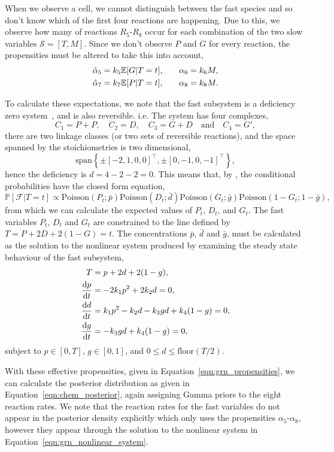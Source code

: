 \documentclass[final]{siamltex}
\begin{document}
When we observe a cell, we cannot distinguish between the fast species and so don't know which of the first four reactions are happening. Due to this, we observe how many of reactions $R_5$-$R_8$ occur for each combination of the two slow variables $\mathcal{S} = [T, M]$. Since we don't observe $P$ and $G$ for every reaction, the propensities must be altered to take this into account,
\begin{align}
	\hat{\alpha}_5 = k_5\mathbb{E}[G|T=t],\quad&\quad \alpha_6 = k_6M, \notag\\
	\hat{\alpha}_7 = k_7\mathbb{E}[P|T=t], \quad&\quad \alpha_8 = k_8M.\label{eqn:grn_propensities}
\end{align}

To calculate these expectations, we note that the fast subsystem is a deficiency zero system~\cite{anderson2010product}, and is also reversible. i.e. The system has four complexes, 
\[
	C_1 = P+P, \quad C_2 = D, \quad C_3 = G+D \quad \text{and} \quad  C_4 = G',
\]
there are two linkage classes (or two sets of reversible reactions), and the space spanned by the stoichiometries is two dimensional,
\[
	\text{span}\left\{\pm[-2, 1, 0, 0]^\top, \pm[0, -1, 0, -1]^\top\right\},
\]
hence the deficiency is $d = 4 - 2 - 2 = 0$. This means that, by \cite{anderson2010product}, the conditional probabilities have the closed form equation,
\[
	\mathbb{P}[\mathcal{F}|T=t] \propto \text{Poisson}(P_t;\bar{p})\text{Poisson}(D_t;\bar{d})\text{Poisson}(G_t;\bar{g})\text{Poisson}(1-G_t;1-\bar{g}),
\]
from which we can calculate the expected values of $P_t$, $D_t$, and $G_t$. The fast variables $P_t$, $D_t$ and $G_t$ are constrained to the line defined by $T=P+2D+2(1-G)=t$. The concentrations $\bar{p}$, $\bar{d}$ and $\bar{g}$, must be calculated as the solution to the nonlinear system produced by examining the steady state behaviour of the fast subsystem,
\begin{align}
	T &= p + 2d + 2(1-g), \notag\\
	\frac{\text{d}p}{\text{d}t} &= -2k_1p^2+2k_2d = 0, \notag\\
	\frac{\text{d}d}{\text{d}t} &= k_1p^2 - k_2d - k_3gd + k_4(1-g) = 0, \notag\\
	\frac{\text{d}g}{\text{d}t} &= -k_3gd + k_4(1-g) = 0, \label{eqn:grn_nonlinear_system}
\end{align}
subject to $p \in [0, T]$, $g \in [0, 1]$, and $0 \leq d \leq \text{floor}(T/2)$.

With these effective propensities, given in Equation~\eqref{eqn:grn_propensities}, we can calculate the posterior distribution as given in Equation~\eqref{eqn:chem_posterior}, again assigning Gamma priors to the eight reaction rates. We note that the reaction rates for the fast variables do not appear in the posterior density explicitly which only uses the propensities $\alpha_5$-$\alpha_8$, however they appear through the solution to the nonlinear system in Equation~\eqref{eqn:grn_nonlinear_system}.
\end{document}
